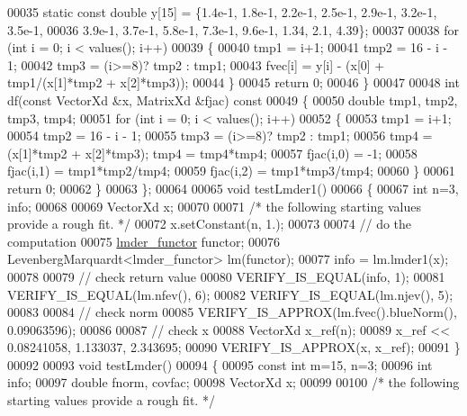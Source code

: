 \begin{DoxyCode}
00035         \textcolor{keyword}{static} \textcolor{keyword}{const} \textcolor{keywordtype}{double} y[15] = \{1.4e-1, 1.8e-1, 2.2e-1, 2.5e-1, 2.9e-1, 3.2e-1, 3.5e-1,
00036             3.9e-1, 3.7e-1, 5.8e-1, 7.3e-1, 9.6e-1, 1.34, 2.1, 4.39\};
00037 
00038         \textcolor{keywordflow}{for} (\textcolor{keywordtype}{int} i = 0; i < values(); i++)
00039         \{
00040             tmp1 = i+1;
00041             tmp2 = 16 - i - 1;
00042             tmp3 = (i>=8)? tmp2 : tmp1;
00043             fvec[i] = y[i] - (x[0] + tmp1/(x[1]*tmp2 + x[2]*tmp3));
00044         \}
00045         \textcolor{keywordflow}{return} 0;
00046     \}
00047 
00048     \textcolor{keywordtype}{int} df(\textcolor{keyword}{const} VectorXd &x, MatrixXd &fjac)\textcolor{keyword}{ const}
00049 \textcolor{keyword}{    }\{
00050         \textcolor{keywordtype}{double} tmp1, tmp2, tmp3, tmp4;
00051         \textcolor{keywordflow}{for} (\textcolor{keywordtype}{int} i = 0; i < values(); i++)
00052         \{
00053             tmp1 = i+1;
00054             tmp2 = 16 - i - 1;
00055             tmp3 = (i>=8)? tmp2 : tmp1;
00056             tmp4 = (x[1]*tmp2 + x[2]*tmp3); tmp4 = tmp4*tmp4;
00057             fjac(i,0) = -1;
00058             fjac(i,1) = tmp1*tmp2/tmp4;
00059             fjac(i,2) = tmp1*tmp3/tmp4;
00060         \}
00061         \textcolor{keywordflow}{return} 0;
00062     \}
00063 \};
00064 
00065 \textcolor{keywordtype}{void} testLmder1()
00066 \{
00067   \textcolor{keywordtype}{int} n=3, info;
00068 
00069   VectorXd x;
00070 
00071   \textcolor{comment}{/* the following starting values provide a rough fit. */}
00072   x.setConstant(n, 1.);
00073 
00074   \textcolor{comment}{// do the computation}
00075   \hyperlink{structlmder__functor}{lmder\_functor} functor;
00076   LevenbergMarquardt<lmder\_functor> lm(functor);
00077   info = lm.lmder1(x);
00078 
00079   \textcolor{comment}{// check return value}
00080   VERIFY\_IS\_EQUAL(info, 1);
00081   VERIFY\_IS\_EQUAL(lm.nfev(), 6);
00082   VERIFY\_IS\_EQUAL(lm.njev(), 5);
00083 
00084   \textcolor{comment}{// check norm}
00085   VERIFY\_IS\_APPROX(lm.fvec().blueNorm(), 0.09063596);
00086 
00087   \textcolor{comment}{// check x}
00088   VectorXd x\_ref(n);
00089   x\_ref << 0.08241058, 1.133037, 2.343695;
00090   VERIFY\_IS\_APPROX(x, x\_ref);
00091 \}
00092 
00093 \textcolor{keywordtype}{void} testLmder()
00094 \{
00095   \textcolor{keyword}{const} \textcolor{keywordtype}{int} m=15, n=3;
00096   \textcolor{keywordtype}{int} info;
00097   \textcolor{keywordtype}{double} fnorm, covfac;
00098   VectorXd x;
00099 
00100   \textcolor{comment}{/* the following starting values provide a rough fit. */}

\end{DoxyCode}
